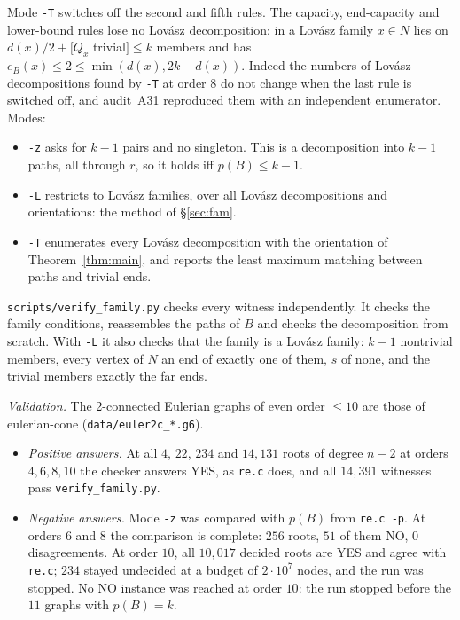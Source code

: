 \documentclass[11pt]{amsart}
\theoremstyle{definition}
\begin{document}
Mode \texttt{-T} switches off the second and fifth rules. The capacity, end-capacity and
lower-bound rules lose no Lov\'asz decomposition: in a Lov\'asz family $x\in N$ lies on
$d(x)/2+[Q_x$ trivial$]\le k$ members and has $e_B(x)\le2\le\min(d(x),2k-d(x))$. Indeed the numbers
of Lov\'asz decompositions found by \texttt{-T} at order $8$ do not change when the last rule is
switched off, and audit~A31 reproduced them with an independent enumerator.
Modes:
\begin{itemize}[leftmargin=*]
\item \texttt{-z} asks for $k-1$ pairs and no singleton. This is a decomposition into $k-1$ paths, all
through $r$, so it holds iff $p(B)\le k-1$.
\item \texttt{-L} restricts to Lov\'asz families, over all Lov\'asz decompositions and orientations:
the method of \S\ref{sec:fam}.
\item \texttt{-T} enumerates every Lov\'asz decomposition with the orientation of
Theorem~\ref{thm:main}, and reports the least maximum matching between paths and trivial ends.
\end{itemize}
\texttt{scripts/verify\_family.py} checks every witness independently. It checks the family
conditions, reassembles the paths of $B$ and checks the decomposition from scratch. With \texttt{-L}
it also checks that the family is a Lov\'asz family: $k-1$ nontrivial members, every vertex of $N$ an
end of exactly one of them, $s$ of none, and the trivial members exactly the far ends.

\emph{Validation.} The 2-connected Eulerian graphs of even order $\le10$ are those of eulerian-cone
(\texttt{data/euler2c\_*.g6}).
\begin{itemize}[leftmargin=*]
\item \emph{Positive answers.} At all $4$, $22$, $234$ and $14{,}131$ roots of degree $n-2$ at orders
$4,6,8,10$ the checker answers YES, as \texttt{re.c} does, and all $14{,}391$ witnesses pass
\texttt{verify\_family.py}.
\item \emph{Negative answers.} Mode \texttt{-z} was compared with $p(B)$ from \texttt{re.c -p}.
At orders $6$ and $8$ the comparison is complete: $256$ roots, $51$ of them NO, $0$ disagreements.
At order $10$, all $10{,}017$ decided roots are YES and agree with \texttt{re.c}; $234$ stayed
undecided at a budget of $2\cdot10^7$ nodes, and the run was stopped. No NO instance was reached at
order $10$: the run stopped before the $11$ graphs with $p(B)=k$.
\end{itemize}
\end{document}
